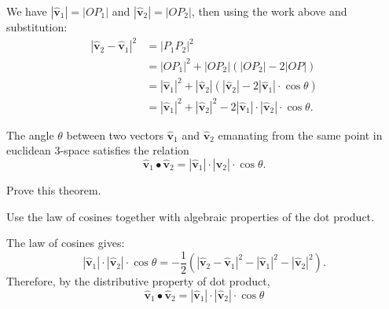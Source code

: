 \documentclass[newpage,hints,handout,nooutcomes,noauthor,12pt]{ximera}
\begin{document}
\begin{problem}
\begin{enumerate}
\begin{freeResponse}
  We have $|\hat{\mathbf v}_{1}|=|OP_{1}|$ and $|\hat{\mathbf v}_{2}|=|OP_{2}|$,
  then using the work above and substitution:
  \begin{align*} 
    |\hat{\mathbf v}_{2} - \hat{\mathbf v}_{1}|^2 &= |P_{1}P_{2}|^{2}\\
    &=|OP_{1}|^{2}+|OP_{2}| \left(|OP_{2}| -2| OP| \right)\\
    &=|\hat{\mathbf v}_{1}|^2 + |\hat{\mathbf v}_{2}|
    \left(|\hat{\mathbf v}_{2}|-2|\hat{\mathbf v}_{1}| \cdot\cos\theta \right) \\
    &=|\hat{\mathbf v}_{1}|^2 +|\hat{\mathbf v}_{2}|^2
    -2|\hat{\mathbf v}_{1}| \cdot |\hat{\mathbf v}_{2}| \cdot\cos\theta.
\end{align*}
\end{freeResponse}

\end{enumerate}
\end{problem}




\begin{theorem}
\label{111}The angle $\theta$ between two vectors $\hat{\mathbf v}_{1}$ and
$\hat{\mathbf v}_{2}$ emanating from the same point in euclidean $3$-space
satisfies the relation
\begin{equation}
  \hat{\mathbf v}_{1}\bullet\hat{\mathbf v}_{2}
  =\left\vert \hat{\mathbf v}_{1}\right\vert \cdot
  \left\vert \hat{\mathbf v}_{2}\right\vert \cdot\cos\theta. \label{2}%
\end{equation}
\end{theorem}


\begin{problem}
  Prove this theorem.
  \begin{hint}
    Use the law of cosines together with algebraic properties of the dot
    product.
  \end{hint}
\begin{freeResponse}
The law of cosines gives:
\[
|\hat{\mathbf v}_{1}|\cdot|\hat{\mathbf v}_{2}|\cdot\cos\theta
= -\frac{1}{2}\left(|\hat{\mathbf v}_{2}-\hat{\mathbf v}_{1}|^2 -|\hat{\mathbf v}_{1}|^2 - |\hat{\mathbf v}_{2}|^2\right).
\]
Therefore, by the distributive property of dot product,
\[
\hat{\mathbf v}_{1}\bullet\hat{\mathbf v}_{2} = |\hat{\mathbf v}_{1}|\cdot|\hat{\mathbf v}_{2}|\cdot\cos\theta
\]
\end{freeResponse} 
\end{problem}
\end{document}
